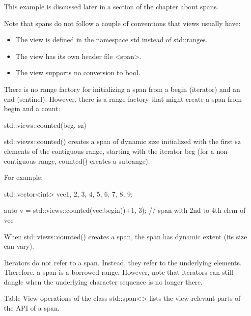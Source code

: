 This example is discussed later in a section of the chapter about spans.

Note that spans do not follow a couple of conventions that views usually have:

\begin{itemize}
\item
The view is defined in the namespace std instead of std::ranges.

\item
The view has its own header file <span>.

\item
The view supports no conversion to bool.
\end{itemize}


There is no range factory for initializing a span from a begin (iterator) and an end (sentinel). However, there is a range factory that might create a span from begin and a count:

\begin{cpp}
std::views::counted(beg, sz)
\end{cpp}

std::views::counted() creates a span of dynamic size initialized with the first sz elements of the contiguous range, starting with the iterator beg (for a non-contiguous range, counted() creates a subrange).

For example:

\begin{cpp}
std::vector<int> vec{1, 2, 3, 4, 5, 6, 7, 8, 9};

auto v = std::views::counted(vec.begin()+1, 3); // span with 2nd to 4th elem of vec
\end{cpp}

When std::views::counted() creates a span, the span has dynamic extent (its size can vary).


Iterators do not refer to a span. Instead, they refer to the underlying elements. Therefore, a span is a borrowed range. However, note that iterators can still dangle when the underlying character sequence is no longer there.


Table View operations of the class std::span<> lists the view-relevant parts of the API of a span.

